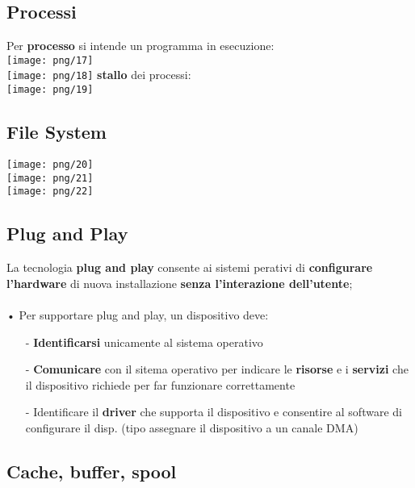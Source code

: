 \documentclass[12pt, letterpaper]{article}
\begin{document}
\subsection{Processi}

Per \textbf{processo} si intende un programma in esecuzione:
\\
\texttt{[image: png/17]}\\
\texttt{[image: png/18]}
\newpage 
\textbf{stallo} dei processi:\\
\texttt{[image: png/19]}

\subsection{File System}

\texttt{[image: png/20]}\\

\texttt{[image: png/21]}\\

\texttt{[image: png/22]}\\

\subsection{Plug and Play}

La tecnologia \textbf{plug and play} consente ai sistemi perativi di \textbf{configurare l'hardware} di nuova installazione \textbf{senza l'interazione dell'utente};
\\
\\
• Per supportare plug and play, un dispositivo deve:
\begin{itemize}
   \item[-] \textbf{Identificarsi}  unicamente al sistema operativo 
   \item[-] \textbf{Comunicare} con il sitema operativo per indicare le \textbf{risorse} e i \textbf{servizi} che il dispositivo richiede per far funzionare correttamente
   \item[-] Identificare il \textbf{driver} che supporta il dispositivo e consentire al software di configurare il disp. (tipo assegnare il dispositivo a un canale DMA) 
\end{itemize}

\subsection{Cache, buffer, spool}
\end{document}
